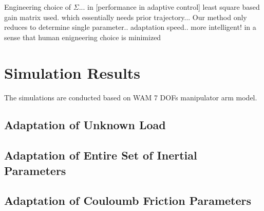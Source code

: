 \documentclass[letterpaper, 10 pt, conference]{ieeeconf}  %
\newtheorem{remark}{Remark}
\begin{document}
Engineering choice of $\Sigma$... in [performance in adaptive control] least square based gain matrix used. which essentially needs prior trajectory... Our method only reduces to determine single parameter.. adaptation speed.. more intelligent! in a sense that human enigneering choice is minimized
\section{Simulation Results}
The simulations are conducted based on WAM 7 DOFs manipulator arm model.
\subsection{Adaptation of Unknown Load}
\newpage
\subsection{Adaptation of Entire Set of Inertial Parameters}
\newpage
\subsection{Adaptation of Couloumb Friction Parameters}
\newpage

\end{document}
